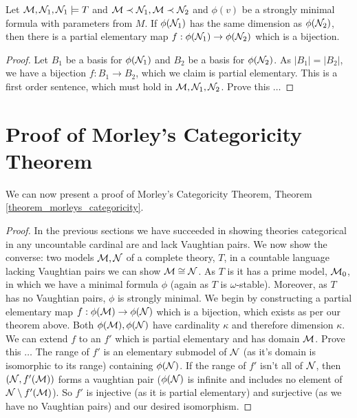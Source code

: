 \begin{theorem}\label{ss} %
Let \(\mathcal{M}, \mathcal{N}_1, \mathcal{N}_1 \models T\) and \(\mathcal{M} \prec \mathcal{N}_1, \mathcal{M} \prec \mathcal{N}_2\) and \(\phi(v)\) be a strongly minimal formula with parameters from \(M\).
If \(\phi(\mathcal{N}_1)\) has the same dimension as \(\phi(\mathcal{N}_2)\), then there is a partial elementary map \(f: \phi(\mathcal{N}_1) \to \phi(\mathcal{N}_2)\) which is a bijection. 
\end{theorem}

\begin{proof} %
Let \(B_1\) be a basis for \(\phi(\mathcal{N}_1)\) and \(B_2\) be a basis for \(\phi(\mathcal{N}_2)\).
As \(|B_1| = |B_2|\), we have a bijection \(f: B_1 \to B_2\), which we claim is partial elementary. 
This is a first order sentence, which must hold in \(\mathcal{M}, \mathcal{N}_1, \mathcal{N}_2\). 
{\color{red}Prove this \(\ldots\)}
\end{proof}

\section{Proof of Morley's Categoricity Theorem}

We can now present a proof of Morley's Categoricity Theorem, Theorem \ref{theorem_morleys_categoricity}.

\begin{proof}
In the previous sections we have succeeded in showing theories categorical in any uncountable cardinal are \omst and lack Vaughtian pairs. 
We now show the converse: two models \(\mathcal{M}, \mathcal{N}\)  of a complete \omst theory, \(T\), in a countable language lacking Vaughtian pairs we can show \(\mathcal{M} \cong \mathcal{N}\). 
As \(T\) is \omst it has a prime model, \(\mathcal{M}_0\), in which we have a minimal formula \(\phi\) (again as \(T\) is \(\omega\)-stable).
Moreover, as \(T\) has no Vaughtian pairs, \(\phi\) is strongly minimal. 
We begin by constructing a partial elementary map \(f:\phi(\mathcal{M}) \to \phi(\mathcal{N})\) which is a bijection, which exists as per our theorem above.
Both \(\phi(\mathcal{M}), \phi(\mathcal{N})\) have cardinality \(\kappa\) and therefore dimension \(\kappa\). 
We can extend \(f\) to an \(f'\) which is partial elementary and has domain \(\mathcal{M}\). 
{\color{red}Prove this \(\ldots\)}
The range of \(f'\) is an elementary submodel of \(\mathcal{N}\) (as it's domain is isomorphic to its range) containing \(\phi(\mathcal{N})\). 
If the range of \(f'\) isn't all of \(\mathcal{N}\), then \((\mathcal{N}, f'(\mathcal{M}))\) forms a vaughtian pair (\(\phi(\mathcal{N})\) is infinite and includes no element of \(\mathcal{N} \setminus f'(\mathcal{M})\)).  
So \(f'\) is injective (as it is partial elementary) and surjective (as we have no Vaughtian pairs) and our desired isomorphism. 
\end{proof}

